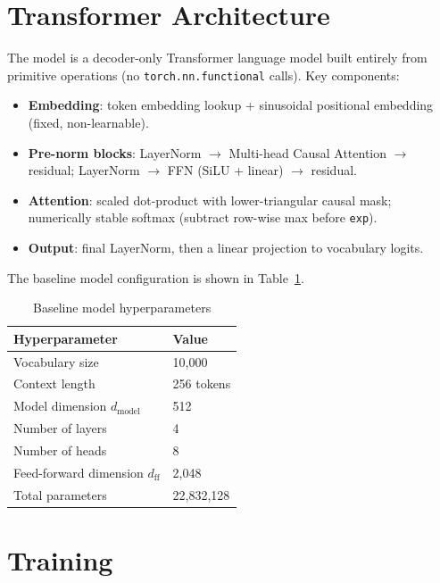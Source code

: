 \documentclass{article}
\begin{document}
\section{Transformer Architecture}

The model is a decoder-only Transformer language model built entirely from
primitive operations (no \texttt{torch.nn.functional} calls).  Key components:

\begin{itemize}
  \item \textbf{Embedding}: token embedding lookup + sinusoidal positional
        embedding (fixed, non-learnable).
  \item \textbf{Pre-norm blocks}: LayerNorm $\to$ Multi-head Causal Attention
        $\to$ residual; LayerNorm $\to$ FFN (SiLU + linear) $\to$ residual.
  \item \textbf{Attention}: scaled dot-product with lower-triangular causal
        mask; numerically stable softmax (subtract row-wise max before
        \texttt{exp}).
  \item \textbf{Output}: final LayerNorm, then a linear projection to
        vocabulary logits.
\end{itemize}

The baseline model configuration is shown in Table~\ref{tab:config}.

\begin{table}[h]
\centering
\caption{Baseline model hyperparameters}
\label{tab:config}
\begin{tabular}{ll}
\toprule
Hyperparameter & Value \\
\midrule
Vocabulary size & 10{,}000 \\
Context length & 256 tokens \\
Model dimension $d_{\text{model}}$ & 512 \\
Number of layers & 4 \\
Number of heads & 8 \\
Feed-forward dimension $d_{\text{ff}}$ & 2{,}048 \\
Total parameters & 22{,}832{,}128 \\
\bottomrule
\end{tabular}
\end{table}

\section{Training}
\end{document}
